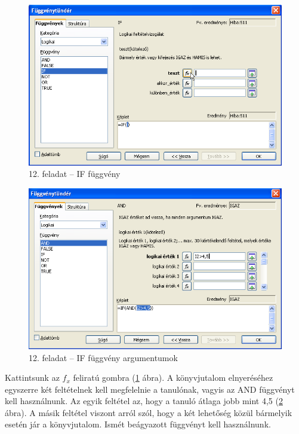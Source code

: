 \begin{figure}[!h]
\begin{center}
\includegraphics[width=13.999cm]{oocalcv1-img68.png}
\caption{12.  feladat --  IF függvény}\label{12-feladatIF}
\end{center}
\end{figure}

\begin{figure}[!h]
\begin{center}
\includegraphics[width=13.999cm]{oocalcv1-img69.png}
\caption{12. feladat --  IF függvény argumentumok}\label{12-feladatArgum}
\end{center}
\end{figure}

Kattintsunk az $f_x$
feliratú gombra (\ref{12-feladatIF} ábra). A könyvjutalom elnyeréséhez
egyszerre két feltételnek kell megfelelnie a tanulónak, vagyis az
AND függvényt kell használnunk. Az egyik feltétel az, hogy a
tanuló átlaga jobb mint 4,5 (\ref{12-feladatArgum} ábra). A másik feltétel
viszont arról szól, hogy a két lehetőség közül
bármelyik esetén jár a könyvjutalom. Ismét beágyazott
függvényt kell használnunk.

